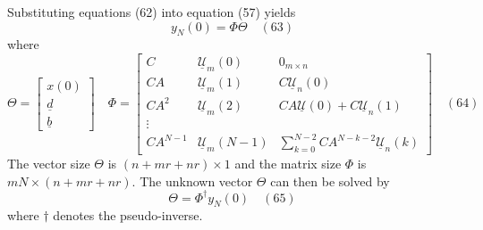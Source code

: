 Substituting equations (62) into equation (57) yields 
\[
    y_N(0)=\Phi\Theta\quad (63)
\]
where 
\[
    \Theta=\begin{bmatrix}
        x(0)\\
        \underline{d}\\
        \underline{b}
    \end{bmatrix}\quad 
    \Phi=\begin{bmatrix}
        C&\underline{\mathcal{U}}_m(0)&0_{m\times n}\\
        CA&\underline{\mathcal{U}}_m(1)&C\underline{\mathcal{U}}_n(0)\\
        CA^2&\underline{\mathcal{U}}_m(2)&CA\underline{\mathcal{U}}(0)+C\underline{\mathcal{U}}_n(1)\\
        \vdots&&\\
        CA^{N-1}&\underline{\mathcal{U}}_m(N-1)&\sum_{k=0}^{N-2}CA^{N-k-2}\underline{\mathcal{U}}_n(k)
    \end{bmatrix}
    \quad (64)
\]
The vector size $\Theta$ is $(n+mr+nr)\times 1$ and the matrix size $\Phi$ is $mN\times (n+mr+nr)$. 
The unknown vector $\Theta$ can then be solved by 
\[
    \Theta=\Phi^\dagger y_N(0)\quad (65)
\]
where $\dagger$ denotes the pseudo-inverse. 